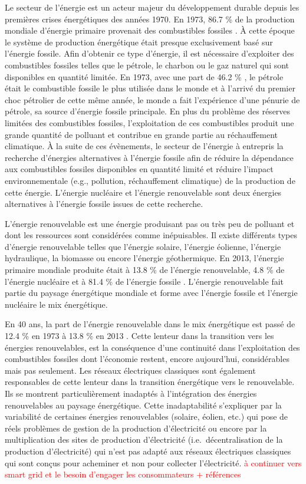 \documentclass[10pt,a5paper,twoside]{article}
\begin{document}
Le secteur de l'énergie est un acteur majeur du développement durable
depuis les premières crises énergétiques des années 1970. En 1973, 86.7
\% de la production mondiale d'énergie primaire provenait des
combustibles fossiles \citep{iea2015key}. À cette époque le système de
production énergétique était presque exclusivement basé sur l'énergie
fossile. Afin d'obtenir ce type d'énergie, il est nécessaire d'exploiter
des combustibles fossiles telles que le pétrole, le charbon ou le gaz
naturel qui sont disponibles en quantité limitée. En 1973, avec une part
de 46.2 \% \citep{iea2015key}, le pétrole était le combustible fossile
le plus utilisée dans le monde et à l'arrivé du premier choc pétrolier
de cette même année, le monde a fait l'expérience d'une pénurie de
pétrole, sa source d'énergie fossile principale. En plus du problème des
réserves limitées des combustibles fossiles, l'exploitation de ces
combustibles produit une grande quantité de polluant et contribue en
grande partie au réchauffement climatique. À la suite de ces évènements,
le secteur de l'énergie à entrepris la recherche d'énergies alternatives
à l'énergie fossile afin de réduire la dépendance aux combustibles
fossiles disponibles en quantité limité et réduire l'impact
environnementale (e.g., pollution, réchauffement climatique) de la
production de cette énergie. L'énergie nucléaire et l'énergie
renouvelable sont deux énergies alternatives à l'énergie fossile issues
de cette recherche.

L'énergie renouvelable est une énergie produisant pas ou très peu de
polluant et dont les ressources sont considérées comme inépuisables. Il
existe différents types d'énergie renouvelable telles que l'énergie
solaire, l'énergie éolienne, l'énergie hydraulique, la biomasse ou
encore l'énergie géothermique. En 2013, l'énergie primaire mondiale
produite était à 13.8 \% de l'énergie renouvelable, 4.8 \% de l'énergie
nucléaire et à 81.4 \% de l'énergie fossile \citep{iea2015key}.
L'énergie renouvelable fait partie du paysage énergétique mondiale et
forme avec l'énergie fossile et l'énergie nucléaire le mix énergétique.

En 40 ans, la part de l'énergie renouvelable dans le mix énergétique est
passé de 12.4 \% en 1973 à 13.8 \% en 2013 \citep{iea2015key}. Cette
lenteur dans la transition vers les énergies renouvelables, est la
conséquence d'une continuité dans l'exploitation des combustibles
fossiles dont l'économie restent, encore aujourd'hui, considérables mais
pas seulement. Les réseaux électriques classiques sont également
responsables de cette lenteur dans la transition énergétique vers le
renouvelable. Ils se montrent particulièrement inadaptés à l'intégration
des énergies renouvelables au paysage énergétique. Cette inadaptabilité
s'expliquer par la variabilité de certaines énergies renouvelables
(solaire, éolien, etc.) qui pose de réels problèmes de gestion de la
production d'électricité ou encore par la multiplication des sites de
production d'électricité (i.e.~décentralisation de la production
d'électricité) qui n'est pas adapté aux réseaux électriques classiques
qui sont conçus pour acheminer et non pour collecter l'électricité.
\textcolor{red}{à continuer vers smart grid et le besoin d'engager les consommateurs + références}
\end{document}
